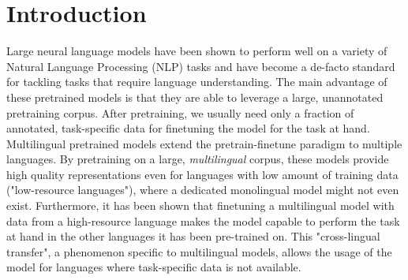 
\chapter{Introduction}





Large neural language models have been shown to perform well on a variety of Natural Language Processing (NLP) tasks and have become a de-facto standard for tackling tasks that require language understanding. The main advantage of these pretrained models is that they are able to leverage a large, unannotated pretraining corpus. After pretraining, we usually need only a fraction of annotated, task-specific data for finetuning the model for the task at hand. \cite{devlin_bert_2019,radford_improving_nodate} Multilingual pretrained models extend the pretrain-finetune paradigm to multiple languages. By pretraining on a large, \textit{multilingual} corpus, these models provide high quality representations even for languages with low amount of training data ("low-resource languages"), where a dedicated monolingual model might not even exist. Furthermore, it has been shown that finetuning a multilingual model with data from a high-resource language makes the model capable to perform the task at hand in the other languages it has been pre-trained on. This "cross-lingual transfer", a phenomenon specific to multilingual models, allows the usage of the model for languages where task-specific data is not available. \cite{k_cross-lingual_2022,conneau_unsupervised_2020-1}

